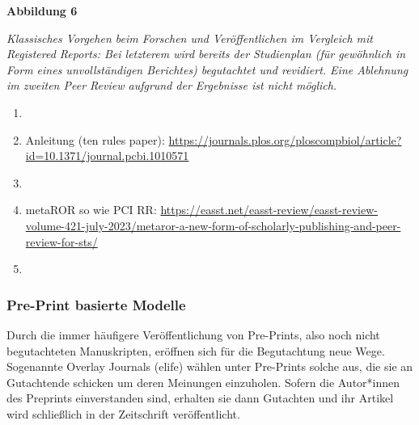 \documentclass[
  letterpaper,
  DIV=11,
  numbers=noendperiod]{scrreprt}
\begin{document}
\textbf{Abbildung 6}

\emph{Klassisches Vorgehen beim Forschen und Veröffentlichen im
Vergleich mit Registered Reports: Bei letzterem wird bereits der
Studienplan (für gewöhnlich in Form eines unvollständigen Berichtes)
begutachtet und revidiert. Eine Ablehnung im zweiten Peer Review
aufgrund der Ergebnisse ist nicht möglich.}

\begin{enumerate}
\def\labelenumi{\arabic{enumi}.}
\item
\item
  Anleitung (ten rules paper):
  \url{https://journals.plos.org/ploscompbiol/article?id=10.1371/journal.pcbi.1010571}
\item
\item
  metaROR so wie PCI RR:
  \url{https://easst.net/easst-review/easst-review-volume-421-july-2023/metaror-a-new-form-of-scholarly-publishing-and-peer-review-for-sts/}
\item
\end{enumerate}

\subsubsection{Pre-Print basierte
Modelle}\label{pre-print-basierte-modelle}

Durch die immer häufigere Veröffentlichung von Pre-Prints, also noch
nicht begutachteten Manuskripten, eröffnen sich für die Begutachtung
neue Wege. Sogenannte Overlay Journals (elife) wählen unter Pre-Prints
solche aus, die sie an Gutachtende schicken um deren Meinungen
einzuholen. Sofern die Autor*innen des Preprints einverstanden sind,
erhalten sie dann Gutachten und ihr Artikel wird schließlich in der
Zeitschrift veröffentlicht.
\end{document}
